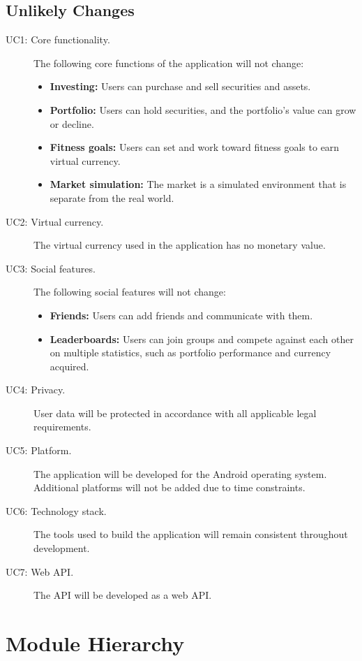 \documentclass[12pt, titlepage]{article}
\begin{document}
\subsection{Unlikely Changes} \label{SecUchange}

\begin{description}
  \item[UC1: Core functionality.] The following core functions of the application will not change:
    \begin{itemize}
      \item \textbf{Investing:} Users can purchase and sell securities and assets.
      \item \textbf{Portfolio:} Users can hold securities, and the portfolio's value can grow or decline.
      \item \textbf{Fitness goals:} Users can set and work toward fitness goals to earn virtual currency.
      \item \textbf{Market simulation:} The market is a simulated environment that is separate from the real world.
    \end{itemize}
  \item[UC2: Virtual currency.] The virtual currency used in the application has no monetary value.
  \item[UC3: Social features.] The following social features will not change:
    \begin{itemize}
      \item \textbf{Friends:} Users can add friends and communicate with them.
      \item \textbf{Leaderboards:} Users can join groups and compete against each other on multiple statistics, such as portfolio performance and currency acquired.
    \end{itemize}
  \item[UC4: Privacy.] User data will be protected in accordance with all applicable legal requirements.
  \item[UC5: Platform.] The application will be developed for the Android operating system. Additional platforms will not be added due to time constraints.
  \item[UC6: Technology stack.] The tools used to build the application will remain consistent throughout development.
  \item[UC7: Web API.] The API will be developed as a web API.
\end{description}

\section{Module Hierarchy} \label{SecMH}
\end{document}
